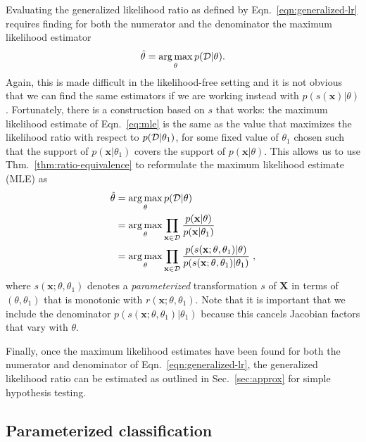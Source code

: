 \documentclass[12pt]{article}
\DeclareMathOperator*{\argmax}{arg\,max}
\numberwithin{equation}{section}
\theoremstyle{plain}
\begin{document}
Evaluating the generalized likelihood ratio as defined by
Eqn.~\ref{eqn:generalized-lr} requires finding for both the numerator and the
denominator the maximum likelihood estimator
\begin{equation}\label{eq:mle}
    \hat{\theta} = \argmax_\theta p({\cal D} | \theta).
\end{equation}
Again, this is made difficult in the likelihood-free setting and it is not
obvious that we can find the same estimators if we are working instead with
$p(s(\mathbf{x})|\theta)$. Fortunately, there is a construction
based on $s$ that works: the maximum likelihood estimate of Eqn.~\ref{eq:mle} is
the same as the value that maximizes the likelihood ratio with respect to
$p({\cal D}|\theta_1)$, for some fixed value of $\theta_1$ chosen such that the support of $p(\mathbf{x}|\theta_1)$ covers the support of $p(\mathbf{x}|\theta)$.
This allows us to
use Thm.~\ref{thm:ratio-equivalence} to reformulate the maximum likelihood
estimate (MLE) as
\begin{align}\label{eq:mle_withs}
\hat{\theta} &= \argmax_\theta  p({\cal D} | \theta) \nonumber \\
&= \argmax_\theta  \prod_{\mathbf{x} \in {\cal D}} \frac{p(\mathbf{x}| \theta)}{p(\mathbf{x}|\theta_1)} \nonumber \\
&= \argmax_\theta  \prod_{\mathbf{x} \in {\cal D}} \frac{p(s(\mathbf{x}; \theta, \theta_1) | \theta)}{p(s(\mathbf{x}; \theta, \theta_1) |\theta_1)} \;,
\end{align}
where $s(\mathbf{x};\theta,\theta_1)$ denotes a \textit{parameterized}
transformation $s$ of $\mathbf{X}$ in terms of $(\theta,\theta_1)$ that is monotonic
with $r(\mathbf{x};\theta,\theta_1)$. Note that it is important that we include
the denominator $p(s(\mathbf{x}; \theta, \theta_1) |\theta_1)$ because this
cancels Jacobian factors that vary with $\theta$.

Finally, once the maximum likelihood estimates have been found for both the numerator
and denominator of Eqn.~\ref{eqn:generalized-lr}, the generalized likelihood
ratio can be estimated as outlined in Sec.~\ref{sec:approx}
for simple hypothesis testing.



\subsection{Parameterized classification}
\label{sec:param-clf}
\end{document}
